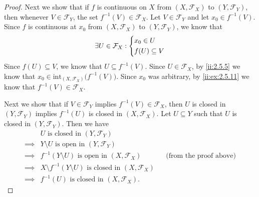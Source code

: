 \begin{proof}
  Next we show that if \(f\) is continuous on \(X\) from \((X, \mathcal{F}_X)\) to \((Y, \mathcal{F}_Y)\), then whenever \(V \in \mathcal{F}_Y\), the set \(f^{-1}(V) \in \mathcal{F}_X\).
  Let \(V \in \mathcal{F}_Y\) and let \(x_0 \in f^{-1}(V)\).
  Since \(f\) is continuous at \(x_0\) from \((X, \mathcal{F}_X)\) to \((Y, \mathcal{F}_Y)\), we know that
  \[
    \exists U \in \mathcal{F}_X : \begin{dcases}
      x_0 \in U \\
      f(U) \subseteq V
    \end{dcases}
  \]
  Since \(f(U) \subseteq V\), we know that \(U \subseteq f^{-1}(V)\).
  Since \(U \in \mathcal{F}_X\), by \cref{ii:2.5.5} we know that \(x_0 \in \text{int}_{(X, \mathcal{F}_X)}\big(f^{-1}(V)\big)\).
  Since \(x_0\) was arbitrary, by \cref{ii:ex:2.5.11} we know that \(f^{-1}(V) \in \mathcal{F}_X\).

  Next we show that if \(V \in \mathcal{F}_Y\) implies \(f^{-1}(V) \in \mathcal{F}_X\), then \(U\) is closed in \((Y, \mathcal{F}_Y)\) implies \(f^{-1}(U)\) is closed in \((X, \mathcal{F}_X)\).
  Let \(U \subseteq Y\) such that \(U\) is closed in \((Y, \mathcal{F}_Y)\).
  Then we have
  \begin{align*}
             & U \text{ is closed in } (Y, \mathcal{F}_Y)                                                                    \\
    \implies & Y \setminus U \text{ is open in } (Y, \mathcal{F}_Y)                                                          \\
    \implies & f^{-1}(Y \setminus U) \text{ is open in } (X, \mathcal{F}_X)               &  & \text{(from the proof above)} \\
    \implies & X \setminus f^{-1}(Y \setminus U) \text{ is closed in } (X, \mathcal{F}_X)                                    \\
    \implies & f^{-1}(U) \text{ is closed in } (X, \mathcal{F}_X).
  \end{align*}


\end{proof}
